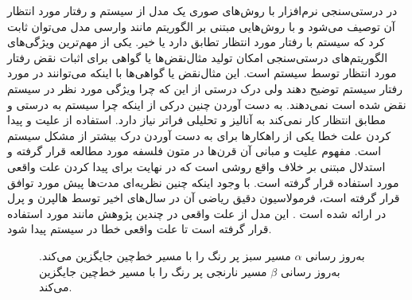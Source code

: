 در درستی‌سنجی نرم‌افزار با روش‌های صوری یک مدل از سیستم و رفتار 
مورد انتظار آن توصیف می‌شود و با روش‌هایی مبتنی بر الگوریتم مانند وارسی مدل%
 \cite{clarke1997model}
می‌توان ثابت کرد که سیستم با رفتار مورد انتظار تطابق دارد یا خیر.
یکی از مهم‌ترین ویژگی‌های الگوریتم‌های درستی‌سنجی امکان تولید مثال‌نقض‌ها%
یا گواهی%
برای اثبات نقض رفتار مورد انتظار توسط سیستم است.
این مثال‌نقض‌ یا گواهی‌ها با اینکه می‌توانند در مورد رفتار سیستم توضیح دهند ولی درک درستی از این که چرا ویژگی مورد نظر در سیستم نقض شده است نمی‌دهند.
به دست آوردن چنین درکی از اینکه چرا سیستم به درستی و مطابق انتظار کار نمی‌کند به آنالیز و تحلیلی فراتر نیاز دارد.
استفاده از علیت%
و پیدا کردن علت خطا
یکی از راهکار‌ها برای به دست آوردن درک بیشتر از مشکل سیستم است.
مفهوم علیت و مبانی آن قرن‌ها در متون فلسفه مورد مطالعه قرار گرفته و استدلال مبتنی بر خلاف واقع%
روشی است که در نهایت برای پیدا کردن علت واقعی مورد استفاده قرار گرفته است.
با وجود اینکه چنین نظریه‌ای مدت‌ها پیش مورد توافق قرار گرفته است، فرمولاسیون دقیق ریاضی آن در سال‌های اخیر توسط هالپرن%
و پرل%
در 
\cite{hp}
ارائه شده است \cite{explications}.
این مدل از علت واقعی در چندین پژوهش مانند 
\cite{Caltais-LTL,causal-hml,causality-checking,chockler}
 مورد استفاده قرار گرفته است تا علت واقعی خطا در سیستم پیدا شود. 
\begin{figure}
    \centering
    \caption{
        به‌روز رسانی 
        $\alpha$
        مسیر سبز پر رنگ‌ را با مسیر خط‌چین جایگزین می‌کند.
        به‌روز رسانی
        $\beta$
        مسیر نارنجی پر رنگ را با مسیر خط‌چین جایگزین می‌کند.
     }
    \label{fig:intro:example}
\end{figure}
